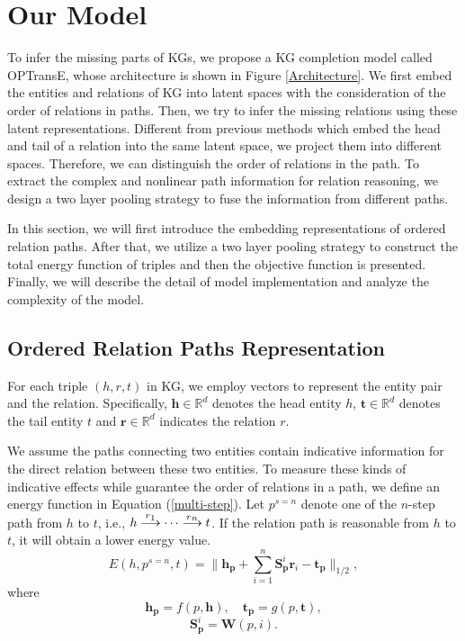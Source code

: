 \documentclass[11pt,a4paper]{article}
\begin{document}
\section{Our Model}

To infer the missing parts of KGs, we propose a KG completion model
called OPTransE, whose architecture is shown in Figure
\ref{Architecture}. We first embed the entities and relations of KG
into latent spaces with the consideration of the order of relations
in paths. Then, we try to infer the missing relations using these
latent representations. Different from previous methods which embed
the head and tail of a relation into the same latent space, we
project them into different spaces. Therefore, we can distinguish
the order of relations in the path. To extract the complex and nonlinear
path information for relation reasoning, we design a two layer pooling
strategy to fuse the information from different paths.

In this section, we will first introduce the embedding
representations of ordered relation paths. After that, we utilize a
two layer pooling strategy to construct the total energy function of
triples and then the objective function is presented. Finally, we
will describe the detail of model implementation and analyze the complexity of the model.

\subsection{Ordered Relation Paths Representation}

For each triple $(h,r,t)$ in KG, we employ vectors to represent the
entity pair and the relation. Specifically,
\(\mathbf{h}\mathbf{\in}\mathbb{R}^{{d}}\) denotes the head entity
$h$, \(\mathbf{t}\mathbf{\in}\mathbb{R}^{{d}}\) denotes the tail
entity $t$ and \(\mathbf{r}\mathbf{\in}\mathbb{R}^{{d}}\) indicates
the relation $r$.

We assume the paths connecting two entities contain indicative
information for the direct relation between these two entities. To
measure these kinds of indicative effects while guarantee the order
of relations in a path, we define an energy function in Equation
(\ref{multi-step}). Let \(p^{s = n} \) denote one of the $n$-step
path from ${h}$ to ${t}$, i.e., ${h}\stackrel{
{r\textsubscript{1}}}{\longrightarrow}\cdots\stackrel{
{r\textsubscript{\emph{n}}}}{\longrightarrow}{t}$. If the relation
path is reasonable from ${h}$ to ${t}$, it will obtain a lower
energy value.
\begin{equation}
E \left( h,p^{s = n},t \right) =
\parallel \mathbf{h_{p}} + \sum\limits_{{i = 1}}^{{n}}\mathbf{S}^{i}_{\mathbf{p}}\mathbf{r}_{i} - \mathbf{t_{p}}
\parallel_{1/2},
\label{multi-step}
\end{equation}
where
\begin{equation}
\mathbf{h_{p}} = f({p},\mathbf{h}), \quad \mathbf{t_{p}} =
g({p},\mathbf{t}), \label{fg}
\end{equation}
\begin{equation}
\mathbf{S}^{i}_{\mathbf{p}} = \mathbf{W}({p, i}). \label{w}
\end{equation}
\end{document}
